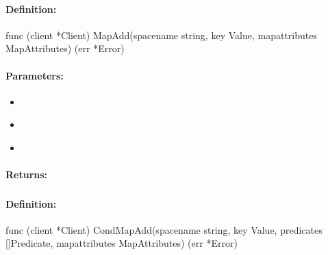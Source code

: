 \paragraph{Definition:}
\begin{gocode}
func (client *Client) MapAdd(spacename string, key Value, mapattributes MapAttributes) (err *Error)
\end{gocode}

\paragraph{Parameters:}
\begin{itemize}[noitemsep]
\item {}\\

\item {}\\

\item {}\\

\end{itemize}

\paragraph{Returns:}


\pagebreak
\subsubsection{}
\label{api:Go:CondMapAdd}


\paragraph{Definition:}
\begin{gocode}
func (client *Client) CondMapAdd(spacename string, key Value, predicates []Predicate, mapattributes MapAttributes) (err *Error)
\end{gocode}

